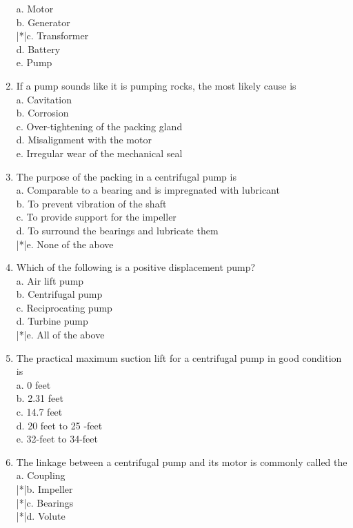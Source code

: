 \begin{enumerate}[1.]
a. Motor\\
b. Generator\\
|*|c. Transformer\\
d. Battery\\
e. Pump\\
\item If a pump sounds like it is pumping rocks, the most likely cause is\\
a. Cavitation\\
b. Corrosion\\
c. Over-tightening of the packing gland\\
d. Misalignment with the motor\\
e. Irregular wear of the mechanical seal\\
\item The purpose of the packing in a centrifugal pump is\\
a. Comparable to a bearing and is impregnated with lubricant\\
b. To prevent vibration of the shaft\\
c. To provide support for the impeller\\
d. To surround the bearings and lubricate them\\
|*|e. None of the above\\
\item Which of the following is a positive displacement pump?\\
a. Air lift pump\\
b. Centrifugal pump\\
c. Reciprocating pump\\
d. Turbine pump\\
|*|e. All of the above\\
\item The practical maximum suction lift for a centrifugal pump in good condition is\\
a. 0 feet\\
b. 2.31 feet\\
c. 14.7 feet\\
d. 20 feet to 25 -feet\\
e. 32-feet to 34-feet\\
\item The linkage between a centrifugal pump and its motor is commonly called the\\
a. Coupling\\
|*|b. Impeller\\
|*|c. Bearings\\
|*|d. Volute\\

\end{enumerate}
